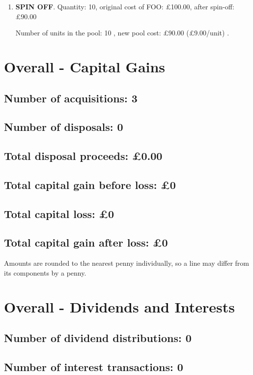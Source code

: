 \documentclass{article}
\begin{document}
\begin{enumerate}
\item \textbf{SPIN OFF}. Quantity: 10,
    original cost of FOO: £100.00, after spin-off: £90.00

    Number of units in the pool:
    10%
,
    new pool cost: £90.00
    (£9.00/unit)%
.

\end{enumerate}




\clearpage
\section*{Overall - Capital Gains}
\subsection*{Number of acquisitions: 3}
\subsection*{Number of disposals: 0}
\subsection*{Total disposal proceeds: £0.00}
\subsection*{Total capital gain before loss: £0}
\subsection*{Total capital loss: £0}
\subsection*{Total capital gain after loss: £0}
\vspace{1em}
Amounts are rounded to the nearest penny individually, so a line may differ from its components by a penny.
\vspace{2em}
\section*{Overall - Dividends and Interests}
\subsection*{Number of dividend distributions: 0}
\subsection*{Number of interest transactions: 0}
\end{document}
